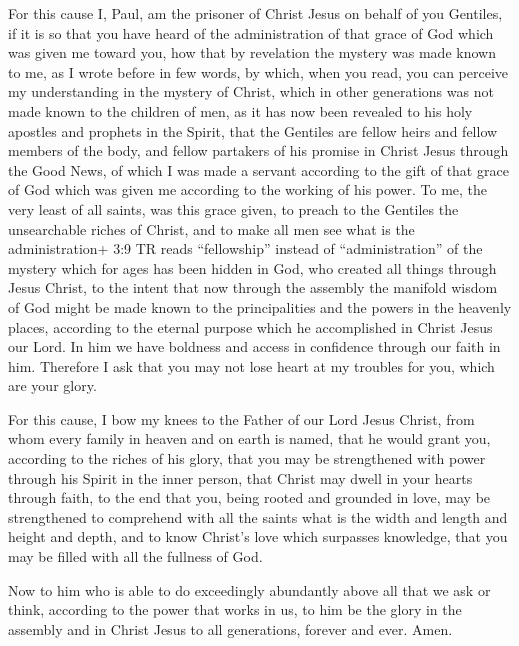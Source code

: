  For this cause I, Paul, am the prisoner of Christ Jesus on
behalf of you Gentiles,  if it is so that you have heard of
the administration of that grace of God which was given me toward you,
 how that by revelation the mystery was made known to me, as
I wrote before in few words,  by which, when you read, you
can perceive my understanding in the mystery of Christ, 
which in other generations was not made known to the children of men, as
it has now been revealed to his holy apostles and prophets in the
Spirit,  that the Gentiles are fellow heirs and fellow
members of the body, and fellow partakers of his promise in Christ Jesus
through the Good News,  of which I was made a servant
according to the gift of that grace of God which was given me according
to the working of his power.  To me, the very least of all
saints, was this grace given, to preach to the Gentiles the unsearchable
riches of Christ,  and to make all men see what is the
administration+ 3:9 TR reads ``fellowship'' instead of
``administration'' of the mystery which for ages has been hidden in God,
who created all things through Jesus Christ,  to the intent
that now through the assembly the manifold wisdom of God might be made
known to the principalities and the powers in the heavenly places,
 according to the eternal purpose which he accomplished in
Christ Jesus our Lord.  In him we have boldness and access
in confidence through our faith in him.  Therefore I ask
that you may not lose heart at my troubles for you, which are your
glory.

 For this cause, I bow my knees to the Father of our Lord
Jesus Christ,  from whom every family in heaven and on
earth is named,  that he would grant you, according to the
riches of his glory, that you may be strengthened with power through his
Spirit in the inner person,  that Christ may dwell in your
hearts through faith, to the end that you, being rooted and grounded in
love,  may be strengthened to comprehend with all the
saints what is the width and length and height and depth, 
and to know Christ's love which surpasses knowledge, that you may be
filled with all the fullness of God.

 Now to him who is able to do exceedingly abundantly above
all that we ask or think, according to the power that works in us,
 to him be the glory in the assembly and in Christ Jesus to
all generations, forever and ever. Amen.

